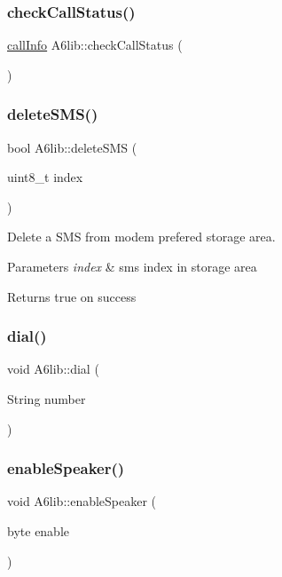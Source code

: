 \subsubsection{\texorpdfstring{check\+Call\+Status()}{checkCallStatus()}}
{\footnotesize\ttfamily \mbox{\hyperlink{structcall_info}{call\+Info}} A6lib\+::check\+Call\+Status (\begin{DoxyParamCaption}{ }\end{DoxyParamCaption})}

\mbox{\label{class_a6lib_a3b0b2dafb06fda63b9b0ab0ae24e33da}} 
\subsubsection{\texorpdfstring{delete\+S\+M\+S()}{deleteSMS()}}
{\footnotesize\ttfamily bool A6lib\+::delete\+S\+MS (\begin{DoxyParamCaption}\item[{uint8\+\_\+t}]{index }\end{DoxyParamCaption})}

Delete a S\+MS from modem prefered storage area. 
\begin{DoxyParams}{Parameters}
{\em index} & sms index in storage area \\
\hline
\end{DoxyParams}
\begin{DoxyReturn}{Returns}
true on success 
\end{DoxyReturn}
\mbox{\label{class_a6lib_a8f424e17a31d51ab813698a6f1a8290c}} 
\subsubsection{\texorpdfstring{dial()}{dial()}}
{\footnotesize\ttfamily void A6lib\+::dial (\begin{DoxyParamCaption}\item[{String}]{number }\end{DoxyParamCaption})}

\mbox{\label{class_a6lib_a86acb23093b4c07f84b56d495799dd10}} 
\subsubsection{\texorpdfstring{enable\+Speaker()}{enableSpeaker()}}
{\footnotesize\ttfamily void A6lib\+::enable\+Speaker (\begin{DoxyParamCaption}\item[{byte}]{enable }\end{DoxyParamCaption})}

